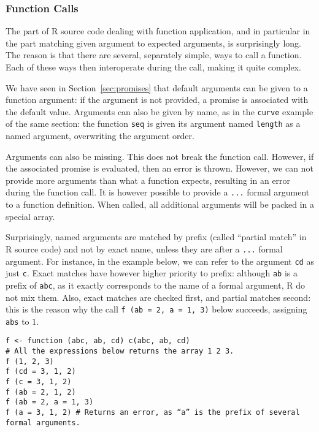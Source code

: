 \documentclass{article}
\newcommand\R{R}
\begin{document}
\subsubsection{Function Calls}

The part of \R{} source code dealing with function application,
and in particular in the part matching given argument to expected arguments,
is surprisingly long.
The reason is that there are several, separately simple, ways to call
a function.
Each of these ways then interoperate during the call,
making it quite complex.

We have seen in Section~\ref{sec:promises} that default arguments can be given
to a function argument:
if the argument is not provided, a promise is associated with the default value.
Arguments can also be given by name,
as in the \texttt{curve} example of the same section:
the function \texttt{seq} is given its argument named \texttt{length}
as a named argument,
overwriting the argument order.

Arguments can also be missing.
This does not break the function call.
However, if the associated promise is evaluated, then an error is thrown.
However, we can not provide more arguments than what a function expects,
resulting in an error during the function call.
It is however possible to provide a \texttt{...} formal argument
to a function definition.
When called, all additional arguments will be packed in a special array.

Surprisingly, named arguments are matched by prefix
(called “partial match” in \R{} source code) and not by exact name,
unless they are after a \texttt{...} formal argument.
For instance, in the example below,
we can refer to the argument \texttt{cd} as just \texttt{c}.
Exact matches have however higher priority to prefix:
although \texttt{ab} is a prefix of \texttt{abc},
as it exactly corresponds to the name of a formal argument,
\R{} do not mix them.
Also, exact matches are checked first, and partial matches second:
this is the reason why the call \texttt{f (ab = 2, a = 1, 3)}
below succeeds, assigning \texttt{abs} to \(1\).
\begin{verbatim}
f <- function (abc, ab, cd) c(abc, ab, cd)
# All the expressions below returns the array 1 2 3.
f (1, 2, 3)
f (cd = 3, 1, 2)
f (c = 3, 1, 2)
f (ab = 2, 1, 2)
f (ab = 2, a = 1, 3)
f (a = 3, 1, 2) # Returns an error, as “a” is the prefix of several formal arguments.
\end{verbatim}
\end{document}
